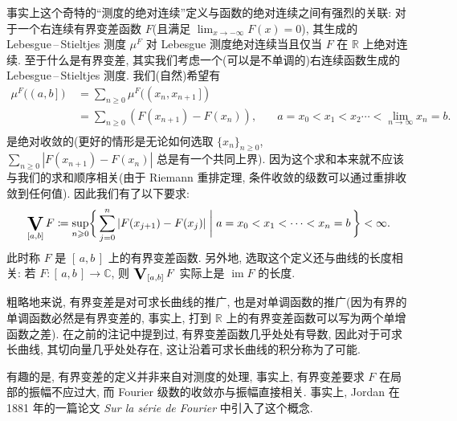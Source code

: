 \begin{alterendnote}
    事实上这个奇特的``测度的绝对连续''定义与函数的绝对连续之间有强烈的关联: 对于一个右连续有界变差函数 $F$(且满足 $\lim_{x\to -\infty}F(x) = 0$), 其生成的 Lebesgue\,--\,Stieltjes 测度 $\mu ^F$ 对 Lebesgue 测度绝对连续当且仅当 $F$ 在 $\mathbb R$ 上绝对连续. 至于什么是有界变差, 其实我们考虑一个(可以是不单调的)右连续函数生成的 Lebesgue\,--\,Stieltjes 测度. 我们(自然)希望有
    \[
        \begin{aligned}
            \mu ^F((a,b\,]) & = \sum_{n\geqslant 0}\mu ^F((x_n,x_{n+1}\,])                                                         \\
                            & = \sum_{n\geqslant 0}(F(x_{n+1})-F(x_n)),    & \quad a=x_0<x_1<x_2\cdots <\lim_{n \to \infty} x_n=b. \\
        \end{aligned}
    \]
    是绝对收敛的(更好的情形是无论如何选取 $\{x_n\}_{n\geqslant 0}$, $\sum_{n\geqslant 0}|F(x_{n+1})-F(x_n)|$ 总是有一个共同上界). 因为这个求和本来就不应该与我们的求和顺序相关(由于 Riemann 重排定理, 条件收敛的级数可以通过重排收敛到任何值). 因此我们有了以下要求:
    \[
        \mathop{\vcenter{\hbox{\LARGE$\mathbf{V}$}}}_{[a,b]}F \coloneqq \sup_{n\geqslant 0}\biggl\{\,\sum_{j=0}^n|F(x_{j+1})-F(x_j)|\biggm|a=x_0<x_1<\cdots <x_n=b\,\biggr\} < \infty
        .\]
    此时称 $F$ 是 $[\,a,b\,]$ 上的有界变差函数. 另外地, 选取这个定义还与曲线的长度相关: 若 $F:[\,a,b\,]\to \mathbb C$, 则 $\mathop{\vcenter{\hbox{\Large$\mathbf{V}$}}}_{[a,b]}F$ 实际上是 $\operatorname{im}F$ 的长度.

    粗略地来说, 有界变差是对可求长曲线的推广, 也是对单调函数的推广(因为有界的单调函数必然是有界变差的, 事实上, 打到 $\mathbb R$ 上的有界变差函数可以写为两个单增函数之差). 在之前的注记中提到过, 有界变差函数几乎处处有导数, 因此对于可求长曲线, 其切向量几乎处处存在, 这让沿着可求长曲线的积分称为了可能.

    有趣的是, 有界变差的定义并非来自对测度的处理, 事实上, 有界变差要求 $F$ 在局部的振幅不应过大, 而 Fourier 级数的收敛亦与振幅直接相关. 事实上, Jordan 在 1881 年的一篇论文 \emph{Sur la série de Fourier} 中引入了这个概念.


\end{alterendnote}
